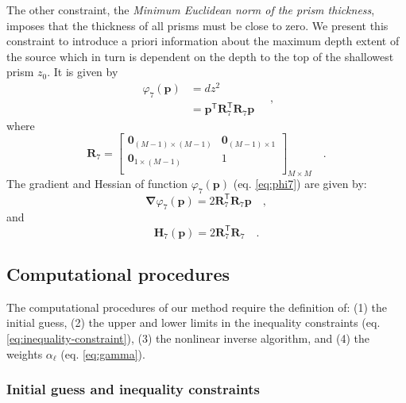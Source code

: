 The other constraint, the \textit{Minimum Euclidean norm of the prism thickness}, imposes that the thickness of all prisms must be close to zero. We present this constraint to introduce a priori information about the maximum depth extent of the source which in turn is dependent on the depth to the top of the shallowest prism $z_{0}$. It is given by
\begin{equation}\label{eq:phi7}
\begin{split}
\varphi_{7}(\mathbf{p}) &= dz^2 \\
&= \mathbf{p}^{\mathsf{T}} \mathbf{R}_{7}^{\mathsf{T}} \mathbf{R}_{7} \mathbf{p}
\end{split} \quad ,
\end{equation}
where
\begin{equation}
\mathbf{R}_{7} =
\begin{bmatrix}
\mathbf{0}_{(M-1) \times (M-1)} & \mathbf{0}_{(M-1) \times 1} \\
\mathbf{0}_{1 \times (M-1)} & 1 \\
\end{bmatrix}_{ M \times M } \quad .
\end{equation}
The gradient and Hessian of function $\varphi_{7}(\mathbf{p})$ (eq. \ref{eq:phi7}) are given by:
\begin{equation}\label{eq:phi7_grad}
\boldsymbol{\nabla}\varphi_{7}(\mathbf{p}) = 2 \mathbf{R}_{7}^{\mathsf{T}} \mathbf{R}_{7} \mathbf{p} \quad ,
\end{equation}
and
\begin{equation}\label{eq:phi7_hessian}
\mathbf{H}_{7}(\mathbf{p}) = 2 \mathbf{R}^{\mathsf{T}}_{7}\mathbf{R}_{7} \quad .
\end{equation}

\subsection{Computational procedures}

The computational procedures of our method require the definition of:
(1) the initial guess, (2) the upper and lower limits in the inequality constraints (eq. \ref{eq:inequality-constraint}), (3) the nonlinear inverse algorithm, and 
(4) the weights $ \alpha_{\ell} $ (eq. \ref{eq:gamma}).

\subsubsection{Initial guess and inequality constraints}


